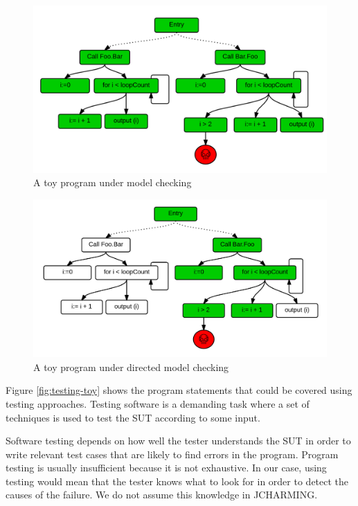 \documentclass[times]{smrauth}
\begin{document}
\begin{figure}[h!]
  \centering
    \includegraphics[scale=0.7]{media/mc.png}
    \caption{A toy program under model checking
    \label{fig:checking-toy}}
\end{figure}

\begin{figure}[h!]
  \centering
    \includegraphics[scale=0.7]{media/dmc.png}
    \caption{A toy program under directed model checking
    \label{fig:dchecking-toy}}
\end{figure}

Figure \ref{fig:testing-toy} shows the program statements that could be covered using testing approaches. Testing software is a demanding task where a set of techniques is used to test the SUT according to some input.

Software testing depends on how well the tester understands the SUT in order to write relevant test cases that are likely to find errors in the program. Program testing is usually insufficient because it is not exhaustive. In our case, using testing would mean that the tester knows what to look for in order to detect the causes of the failure. We do not assume this knowledge in JCHARMING. 
\end{document}
